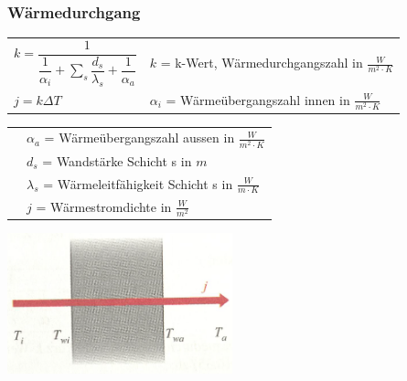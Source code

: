 		\subsubsection{Wärmedurchgang}
			\begin{minipage}{12cm}
					\renewcommand{\arraystretch}{2.5}
					\begin{tabular}{ p{4cm} | p{7cm}}
						$k = \dfrac{1}{\dfrac{1}{\alpha_i} + \sum\limits_{s}\dfrac{d_s}{\lambda_s} + \dfrac{1}{\alpha_a}}$	&	$k$ = k-Wert, Wärmedurchgangszahl in $\frac{W}{m^2 \cdot K}$\\
						$j = k \Delta T$	&	$\alpha_i$ = Wärmeübergangszahl innen in $\frac{W}{m^2 \cdot K}$\\
					\end{tabular}
					\renewcommand{\arraystretch}{1.5}
					\begin{tabular}{ p{4cm} | p{7cm} }
						& $\alpha_a$ = Wärmeübergangszahl aussen in $\frac{W}{m^2 \cdot K}$\\
						& $d_s$ = Wandstärke Schicht s in $m$\\
						& $\lambda_s$ = Wärmeleitfähigkeit Schicht s in $\frac{W}{m \cdot K}$\\
						& $j$ = Wärmestromdichte in $\frac{W}{m^2}$\\
					\end{tabular} 
					\renewcommand{\arraystretch}{1}
			\end{minipage}
			\begin{minipage}{10cm}
				\vspace{-\ht\strutbox}\includegraphics[width=6.5cm]{./bilder/Waermedurchgang.png}
			\end{minipage}
			\newline
			\newline
			\newline
			\newline

